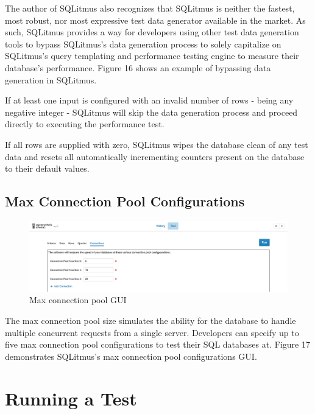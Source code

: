 \documentclass[12pt]{report}
\begin{document}
\begin{spacing}{1.9}
	The author of SQLitmus also recognizes that SQLitmus is neither the fastest, most robust, nor most expressive test data generator available in the market. As such, SQLitmus provides a way for developers using other test data generation tools to bypass SQLitmus's data generation process to solely capitalize on SQLitmus's query templating and performance testing engine to measure their database's performance. Figure 16 shows an example of bypassing data generation in SQLitmus.
	
	If at least one input is configured with an invalid number of rows - being any negative integer - SQLitmus will skip the data generation process and proceed directly to executing the performance test. 
	
	If all rows are supplied with zero, SQLitmus wipes the database clean of any test data and resets all automatically incrementing counters present on the database to their default values.
	
	\subsection{Max Connection Pool Configurations}
	
	\begin{figure}[H]
		\centering
		\includegraphics[width=\textwidth]{3-4-2.png}
		\caption{Max connection pool GUI}
		
	\end{figure}
	
	The max connection pool size simulates the ability for the database to handle multiple concurrent requests from a single server. Developers can specify up to five max connection pool configurations to test their SQL databases at. Figure 17 demonstrates SQLitmus's max connection pool configurations GUI.
	
	\section{Running a Test}
	

\end{spacing}
\end{document}
